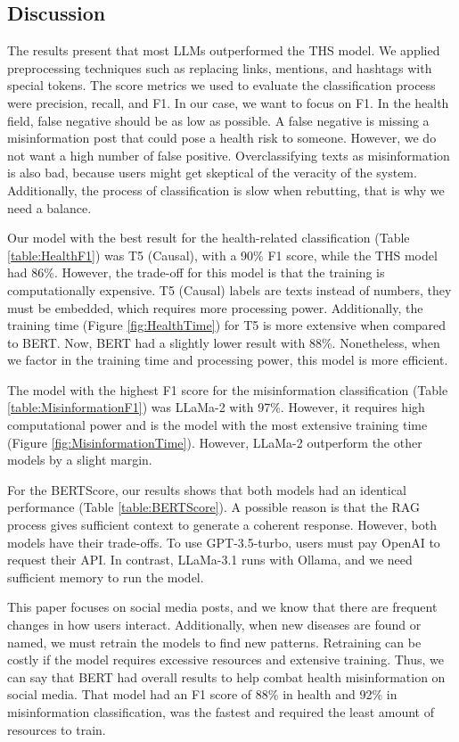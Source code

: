\subsection{Discussion}

The results present that most LLMs outperformed the THS model. We applied preprocessing techniques such as replacing links, mentions, and hashtags with special tokens.
The score metrics we used to evaluate the classification process were precision, recall, and F1. In our case, we want to focus on F1. In the health field, false negative should be
as low as possible. A false negative is missing a misinformation post that could pose a health risk to someone. However, we do not want a high number of false positive. Overclassifying 
texts as misinformation is also bad, because users might get skeptical of the veracity of the system. Additionally, the process of classification is slow when rebutting, that is why we need a balance.

Our model with the best result for the health-related classification (Table \ref{table:HealthF1}) was T5 (Causal), with a 90\% F1 score, while the THS model had 86\%. However, the trade-off
for this model is that the training is computationally expensive. T5 (Causal) labels are texts instead of numbers, they must be embedded, which requires more processing power. Additionally,
the training time (Figure \ref{fig:HealthTime}) for T5 is more extensive when compared to BERT. Now, BERT had a slightly lower result with 88\%. Nonetheless, when we factor in the
training time and processing power, this model is more efficient.

The model with the highest F1 score for the misinformation classification (Table \ref{table:MisinformationF1}) was LLaMa-2 with 97\%. However, it requires high computational power and is
the model with the most extensive training time (Figure \ref{fig:MisinformationTime}). However, LLaMa-2 outperform the other models by a slight margin. 

For the BERTScore, our results shows that both models had an identical performance (Table \ref{table:BERTScore}). A possible reason is that the RAG process gives sufficient context to generate a
coherent response. However, both models have their trade-offs. To use GPT-3.5-turbo, users must pay OpenAI to request their API. In contrast, LLaMa-3.1 runs with Ollama, and we need sufficient
memory to run the model.

This paper focuses on social media posts, and we know that there are frequent changes in how users interact. Additionally, when new diseases are found or named, we must retrain the
models to find new patterns. Retraining can be costly if the model requires excessive resources and extensive training. Thus, we can say that BERT had overall results to help combat
health misinformation on social media. That model had an F1 score of 88\% in health and 92\% in misinformation classification, was the fastest and required the least amount of resources to train.




